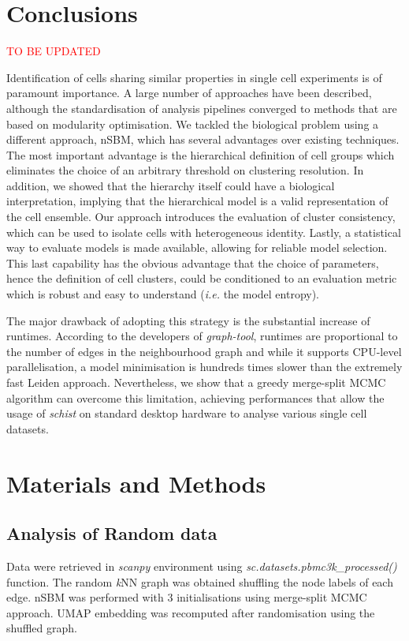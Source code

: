 \documentclass[10pt]{article}
\begin{document}
\section*{Conclusions}
\textcolor{red}{TO BE UPDATED}

Identification of cells sharing similar properties in single cell experiments is of paramount importance. A large number of approaches have been described, although the standardisation of analysis pipelines converged to methods that are based on modularity optimisation. We tackled the biological problem using a different approach, nSBM, which has several advantages over existing techniques. The most important advantage is the hierarchical definition of cell groups which eliminates the choice of an arbitrary threshold on clustering resolution. In addition, we showed that the hierarchy itself could have a biological interpretation, implying that the hierarchical model is a valid representation of the cell ensemble. Our approach introduces the evaluation of cluster consistency, which can be used to isolate cells with heterogeneous identity. Lastly, a statistical way to evaluate models is made available, allowing for reliable model selection. This last capability has the obvious advantage that the choice of parameters, hence the definition of cell clusters, could be conditioned to an evaluation metric which is robust and easy to understand (\emph{i.e.} the model entropy).

The major drawback of adopting this strategy is the substantial increase of runtimes. According to the developers of \emph{graph-tool}, runtimes are proportional to the number of edges in the neighbourhood graph and while it supports CPU-level parallelisation, a model minimisation is hundreds times slower than the extremely fast Leiden approach. Nevertheless, we show that a greedy merge-split MCMC algorithm can overcome this limitation, achieving performances that allow the usage of \emph{schist} on standard desktop hardware to analyse various single cell datasets.


\section*{Materials and Methods}

\subsection*{Analysis of Random data}
Data were retrieved in \emph{scanpy} environment using \emph{sc.datasets.pbmc3k\_processed()} function. The random \emph{k}NN graph was obtained shuffling the node labels of each edge. nSBM was performed with 3 initialisations using merge-split MCMC approach. UMAP embedding was recomputed after randomisation using the shuffled graph.
\end{document}
